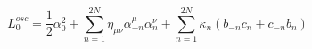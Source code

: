 \begin{equation}
L_{0}^{osc}=\frac{1}{2}\alpha _{0}^{2}+\sum_{n=1}^{2N}\eta _{\mu \nu }\alpha
_{-n}^{\mu }\alpha _{n}^{\nu }+\sum_{n=1}^{2N}\kappa
_{n}(b_{-n}c_{n}+c_{-n}b_{n})
\end{equation}%
